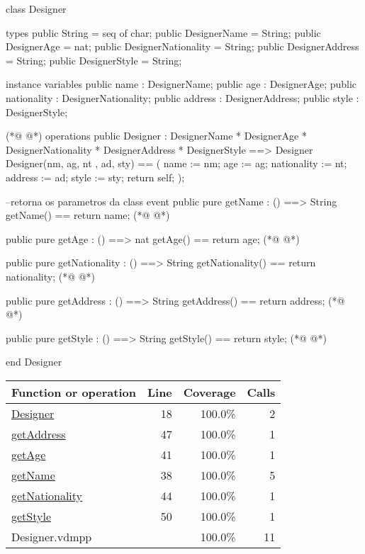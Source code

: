 \begin{vdmpp}[breaklines=true]
class Designer

types
 public String = seq of char;
 public DesignerName = String;
 public DesignerAge = nat;
 public DesignerNationality = String;
 public DesignerAddress = String;
 public DesignerStyle = String;
 
instance variables
 public name : DesignerName;
 public age : DesignerAge;
 public nationality : DesignerNationality;
 public address : DesignerAddress;
 public style : DesignerStyle;
 
(*@
\label{Designer:18}
@*)
 operations
  public Designer : 
          DesignerName * 
          DesignerAge *
          DesignerNationality * 
          DesignerAddress * 
          DesignerStyle   ==> Designer
  Designer(nm, ag, nt , ad, sty) ==
  (
    name := nm;
    age := ag;
    nationality := nt;
    address := ad;
    style := sty;
    return self;
  );
  
  --retorna os parametros da class event
  public pure getName : () ==> String
    getName() == return name;
(*@
\label{getName:38}
@*)
    
   public pure getAge : () ==> nat
     getAge() == return age;
(*@
\label{getAge:41}
@*)
     
  public pure getNationality : () ==> String
     getNationality() == return nationality;
(*@
\label{getNationality:44}
@*)
     
  public pure getAddress : () ==> String
     getAddress() == return address;      
(*@
\label{getAddress:47}
@*)
     
  public pure getStyle : () ==> String
     getStyle() == return style;
(*@
\label{getStyle:50}
@*)
     
end Designer
\end{vdmpp}
\bigskip
\begin{longtable}{|l|r|r|r|}
\hline
Function or operation & Line & Coverage & Calls \\
\hline
\hline
\hyperref[Designer:18]{Designer} & 18&100.0\% & 2 \\
\hline
\hyperref[getAddress:47]{getAddress} & 47&100.0\% & 1 \\
\hline
\hyperref[getAge:41]{getAge} & 41&100.0\% & 1 \\
\hline
\hyperref[getName:38]{getName} & 38&100.0\% & 5 \\
\hline
\hyperref[getNationality:44]{getNationality} & 44&100.0\% & 1 \\
\hline
\hyperref[getStyle:50]{getStyle} & 50&100.0\% & 1 \\
\hline
\hline
Designer.vdmpp & & 100.0\% & 11 \\
\hline
\end{longtable}

